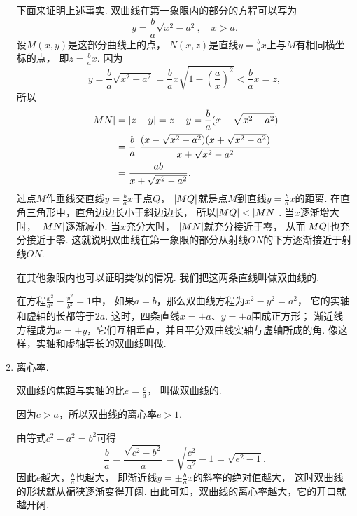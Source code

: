 \begin{enumerate}
	下面来证明上述事实.
	双曲线在第一象限内的部分的方程可以写为\begin{equation*}
		y = \frac{b}{a} \sqrt{x^2-a^2},
		\quad x > a.
	\end{equation*}
	设\(M(x,y)\)是这部分曲线上的点，
	\(N(x,z)\)是直线\(y = \frac{b}{a} x\)上与\(M\)有相同横坐标的点，
	即\(z = \frac{b}{a} x\).
	因为\begin{equation*}
		y = \frac{b}{a} \sqrt{x^2-a^2}
		= \frac{b}{a} x \sqrt{1 - \left( \frac{a}{x} \right)^2}
		< \frac{b}{a} x
		= z,
	\end{equation*}
	所以\begin{align*}
		\abs{MN}
		&= \abs{z - y}
		= z - y
		= \frac{b}{a} (x - \sqrt{x^2 - a^2}) \\
		&= \frac{b}{a}
			~ \frac{
				(x - \sqrt{x^2 - a^2})(x + \sqrt{x^2 - a^2})
			}{
				x + \sqrt{x^2 - a^2}
			} \\
		&= \frac{a b}{x + \sqrt{x^2 - a^2}}.
	\end{align*}
	过点\(M\)作垂线交直线\(y = \frac{b}{a} x\)于点\(Q\)，
	\(\abs{MQ}\)就是点\(M\)到直线\(y = \frac{b}{a} x\)的距离.
	在直角三角形中，直角边边长小于斜边边长，
	所以\(\abs{MQ} < \abs{MN}\).
	当\(x\)逐渐增大时，
	\(\abs{MN}\)逐渐减小.
	当\(x\)充分大时，
	\(\abs{MN}\)就充分接近于零，
	从而\(\abs{MQ}\)也充分接近于零.
	这就说明双曲线在第一象限的部分从射线\(ON\)的下方逐渐接近于射线\(ON\).

	在其他象限内也可以证明类似的情况.
	我们把这两条直线叫做双曲线的.

	在方程\(\frac{x^2}{a^2}-\frac{y^2}{b^2}=1\)中，
	如果\(a=b\)，那么双曲线方程为\(x^2-y^2=a^2\)，
	它的实轴和虚轴的长都等于\(2a\).
	这时，四条直线\(x=\pm a\)、\(y=\pm a\)围成正方形；
	渐近线方程成为\(x=\pm y\)，它们互相垂直，并且平分双曲线实轴与虚轴所成的角.
	像这样，实轴和虚轴等长的双曲线叫做.

	\item 离心率.

	双曲线的焦距与实轴的比\(e = \frac{c}{a}\)，
	叫做双曲线的.

	因为\(c > a\)，所以双曲线的离心率\(e > 1\).

	由等式\(c^2-a^2=b^2\)可得\begin{equation*}
		\frac{b}{a} = \frac{\sqrt{c^2-b^2}}{a}
		= \sqrt{\frac{c^2}{a^2}-1} = \sqrt{e^2-1}.
	\end{equation*}
	因此\(e\)越大，\(\frac{b}{a}\)也越大，
	即渐近线\(y = \pm\frac{b}{a}x\)的斜率的绝对值越大，
	这时双曲线的形状就从褊狭逐渐变得开阔.
	由此可知，双曲线的离心率越大，它的开口就越开阔.
\end{enumerate}

